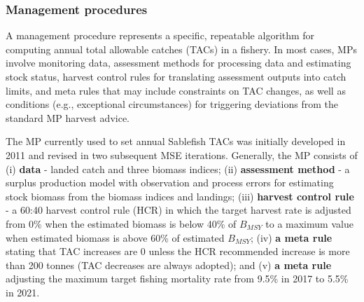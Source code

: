 \documentclass[11pt]{book}
\begin{document}
\hypertarget{management-procedures}{%
\subsubsection{Management procedures}\label{management-procedures}}

A management procedure represents a specific, repeatable algorithm for computing annual total allowable catches (TACs) in a fishery. In most cases, MPs involve monitoring data, assessment methods for processing data and estimating stock status, harvest control rules for translating assessment outputs into catch limits, and meta rules that may include constraints on TAC changes, as well as conditions (e.g., exceptional circumstances) for triggering deviations from the standard MP harvest advice.

The MP currently used to set annual Sablefish TACs was initially developed in 2011 and revised in two subsequent MSE iterations. Generally, the MP consists of (i) \textbf{data} - landed catch and three biomass indices; (ii) \textbf{assessment method} - a surplus production model with observation and process errors for estimating stock biomass from the biomass indices and landings; (iii) \textbf{harvest control rule} - a 60:40 harvest control rule (HCR) in which the target harvest rate is adjusted from 0\% when the estimated biomass is below 40\% of \(B_{MSY}\) to a maximum value when estimated biomass is above 60\% of estimated \(B_{MSY}\); (iv) \textbf{a meta rule} stating that TAC increases are 0 unless the HCR recommended increase is more than 200 tonnes (TAC decreases are always adopted); and (v) \textbf{a meta rule} adjusting the maximum target fishing mortality rate from 9.5\% in 2017 to 5.5\% in 2021.
\end{document}
